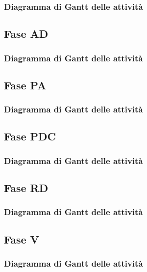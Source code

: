 		\subsubsection{Diagramma di Gantt delle attività}
	\subsection{Fase AD}
		\subsubsection{Diagramma di Gantt delle attività}
	\subsection{Fase PA}
		\subsubsection{Diagramma di Gantt delle attività}
	\subsection{Fase PDC}
		\subsubsection{Diagramma di Gantt delle attività}
	\subsection{Fase RD}
		\subsubsection{Diagramma di Gantt delle attività}
	\subsection{Fase V}
		\subsubsection{Diagramma di Gantt delle attività}
	
